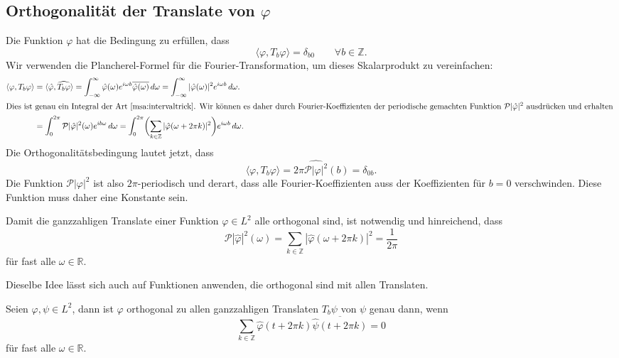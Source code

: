 %
%
\subsection{Orthogonalität der Translate von $\varphi$}
Die Funktion $\varphi$ hat die Bedingung zu erfüllen, dass
\[
\langle \varphi, T_b\varphi\rangle = \delta_{b0}
\qquad\forall b\in\mathbb Z.
\]
Wir verwenden die Plancherel-Formel für die Fourier-Transformation,
um dieses Skalarprodukt zu vereinfachen:
\begin{align*}
\langle \varphi,T_b\varphi\rangle
&=
\langle \hat{\varphi},\widehat{T_b\varphi}\rangle
=
\int_{-\infty}^\infty
\hat{\varphi}(\omega) e^{i\omega b}\overline{\hat{\varphi}(\omega)}
\,d\omega
=
\int_{-\infty}^\infty
|\hat{\varphi}(\omega)|^2 e^{i\omega b}
\,d\omega.
\\
\intertext{Dies ist genau ein Integral der Art~\eqref{msa:intervaltrick}.
Wir können es daher durch Fourier-Koeffizienten der periodische 
gemachten Funktion $\mathcal{P}|\hat{\varphi}|^2$ ausdrücken und
erhalten
}
&=
\int_0^{2\pi}
\mathcal{P}|\hat{\varphi}|^2(\omega) e^{ib\omega}
\,d\omega
=
\int_0^{2\pi}
\biggl(
\sum_{k\in\mathbb Z}
|\hat{\varphi}(\omega + 2\pi k)|^2\biggr)
e^{i\omega b}
\,d\omega.
\end{align*}
Die Orthogonalitätsbedingung lautet jetzt, dass 
\[
\langle \varphi,T_b\varphi\rangle
=
2\pi
\widehat{\mathcal{P}|\varphi|^2}(b)
=
\delta_{0b}.
\]
Die Funktion $\mathcal{P}|\varphi|^2$ ist also $2\pi$-periodisch und
derart, dass alle Fourier-Koeffizienten auss der Koeffizienten für
$b=0$ verschwinden.
Diese Funktion muss daher eine Konstante sein.

\begin{satz}
\label{satz:msa:orthogonalitaetsbedingung}
Damit die ganzzahligen Translate einer Funktion $\varphi\in L^2$ alle
orthogonal sind, ist notwendig und hinreichend, dass 
\begin{equation}
\mathcal{P}|\hat{\varphi}|^2(\omega)
=
\sum_{k\in\mathbb Z} |\hat{\varphi}(\omega + 2\pi k)|^2
=
\frac1{2\pi}
\label{msa:orthogonalitaetsbedingung}
\end{equation}
für fast alle $\omega\in\mathbb R$.
\end{satz}

Dieselbe Idee lässt sich auch auf Funktionen anwenden, die orthogonal
sind mit allen Translaten.

\begin{satz}
\label{satz:msa:alleorthogonal}
Seien $\varphi,\psi\in L^2$, dann ist $\varphi$ orthogonal zu allen
ganzzahligen Translaten $T_b\psi$  von $\psi$ genau dann, wenn
\begin{equation}
\sum_{k\in\mathbb Z} \hat{\varphi}(t+2\pi k)\overline{\hat{\psi}(t+2\pi k)}
=
0
\end{equation}
für fast alle $\omega\in\mathbb R$.
\end{satz}

